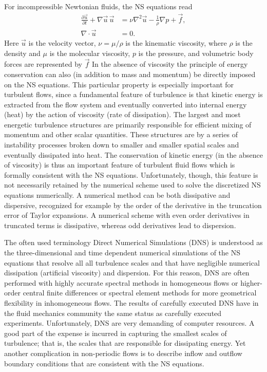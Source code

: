 For incompressible Newtonian fluids, the NS equations read
\begin{align}
 \frac{\partial \vec{u}}{\partial t}+\nabla \vec{u} \,  \vec{u}
      &= \nu \nabla^2 \vec{u} -\frac{1}{\rho} \nabla p +\vec{f}, \label{eq:mortensen:NS}
\\
 \nabla \cdot \vec{u} &=0.
 \label{eq:mortensen:cont}
\end{align}
Here $\vec{u}$ is the velocity vector, $\nu = \mu/\rho$
is the kinematic viscosity, where $\rho$ is the density and
$\mu$ is the molecular viscosity, $p$
is the pressure, and volumetric body forces are represented by $\vec{f}$
In the absence of viscosity the principle of energy conservation can
also (in addition to mass and momentum) be directly imposed on the NS
equations. This particular property is especially important for turbulent
flows, since a fundamental feature of turbulence is that kinetic energy
is extracted from the flow system and eventually converted into internal
energy (heat) by the action of viscosity (rate of dissipation). The
largest and most energetic turbulence structures are primarily responsible
for efficient mixing of momentum and other scalar quantities. These
structures are by a series of instability processes broken down to
smaller and smaller spatial scales and eventually dissipated into
heat. The conservation of kinetic energy (in the absence of viscosity)
is thus an important feature of turbulent fluid flows which is formally
consistent with the NS equations. Unfortunately, though, this feature
is not necessarily retained by the numerical scheme used to solve the
discretized NS equations numerically. A numerical method can be both
dissipative and dispersive, recognized for example by the order of the
derivative in the truncation error of Taylor expansions. A numerical
scheme with even order derivatives in truncated terms is dissipative,
whereas odd derivatives lead to dispersion.

The often used terminology Direct Numerical Simulations (DNS) is
understood as the three-dimensional and time dependent numerical
simulations of the NS equations that resolve all all turbulence scales
and that have negligible numerical dissipation (artificial viscosity)
and dispersion. For this reason, DNS are often performed with highly
accurate spectral methods \citep{CanutoHussainiQuarteroniEtAl2007}
in homogeneous flows or higher-order central finite differences or
spectral element methods \citep{Blackburn2009} for more geometrical
flexibility in inhomogeneous flows. The results of carefully executed
DNS have in the fluid mechanics community the same status as carefully
executed experiments. Unfortunately, DNS are very demanding of computer
resources. A good part of the expense is incurred in capturing the
smallest scales of turbulence; that is, the scales that are responsible
for dissipating energy. Yet another complication in non-periodic flows
is to describe inflow and outflow boundary conditions that are consistent
with the NS equations.


